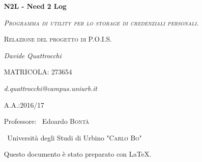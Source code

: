 \documentclass[a4paper,10pt]{report} %
\begin{document}
\begin{titlepage}%
	\centering
	\vspace{1.5cm}
	{\huge\bfseries N2L - Need 2 Log\par}
  \vspace{1cm}
  {\scshape\large\itshape Programma di utility per lo storage di credenziali personali.\par}
	\vspace{0.5cm}
  {\scshape\large Relazione del progetto di P.O.I.S.\par}
	\vspace{2cm}
	{\Large\itshape Davide Quattrocchi\par}
  {\large MATRICOLA: 273654\par}
	{\itshape d.quattrocchi@campus.uniurb.it\par}
	\vfill
  {\large A.A.:2016/17\par}
	\vspace{0.2cm}
	Professore: ~Edoardo \textsc{Bontà}\par
	\vspace{1.0cm}
	~Università degli Studi di Urbino \textsc{"Carlo Bo"}\par
	\vfill
  \vspace{0.5cm}
  Questo documento è stato preparato con \LaTeX.
  \end{titlepage}
\newpage
\end{document}
